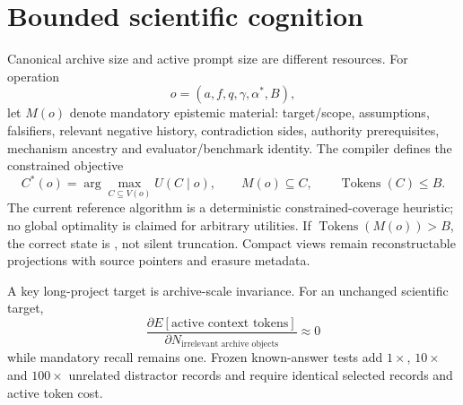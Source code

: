 \section{Bounded scientific cognition}
Canonical archive size and active prompt size are different resources. For operation
\begin{equation}o=(a,f,q,\gamma,\alpha^*,B),\end{equation}
let $M(o)$ denote mandatory epistemic material: target/scope, assumptions, falsifiers, relevant negative history, contradiction sides, authority prerequisites, mechanism ancestry and evaluator/benchmark identity. The compiler defines the constrained objective
\begin{equation}C^*(o)=\arg\max_{C\subseteq V(o)}U(C\mid o),\qquad M(o)\subseteq C,\qquad \operatorname{Tokens}(C)\le B.\end{equation}
The current reference algorithm is a deterministic constrained-coverage heuristic; no global optimality is claimed for arbitrary utilities. If $\operatorname{Tokens}(M(o))>B$, the correct state is \CannotCompile{}, not silent truncation. Compact views remain reconstructable projections with source pointers and erasure metadata.

A key long-project target is archive-scale invariance. For an unchanged scientific target,
\begin{equation}\frac{\partial E[\text{active context tokens}]}{\partial N_{\text{irrelevant archive objects}}}\approx0\end{equation}
while mandatory recall remains one. Frozen known-answer tests add $1\times$, $10\times$ and $100\times$ unrelated distractor records and require identical selected records and active token cost.

